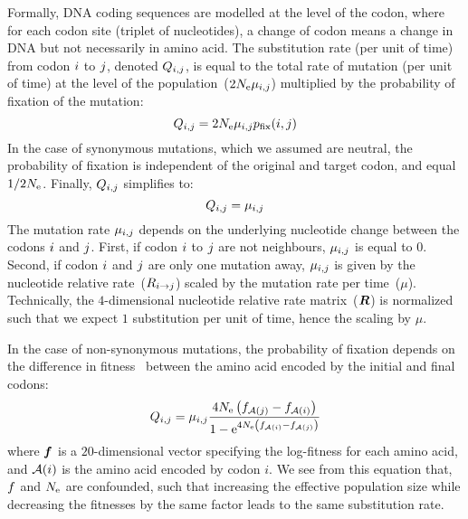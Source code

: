 Formally, \acrshort{DNA} coding sequences are modelled at the level of the codon, where for each codon site (triplet of nucleotides), a change of codon means a change in \acrshort{DNA} but not necessarily in amino acid.
The substitution rate (per unit of time) from codon ${i}$ to ${j}$, denoted $Q_{{i}, {j}}$, is equal to the total rate of mutation (per unit of time) at the level of the population~($2N_{\mathrm{e}}\mu_{{i}, {j}}$) multiplied by the probability of fixation of the mutation:
\begin{equation}
{Q_{{i}, {j}}}
    = 2 N_{\mathrm{e}} \mu_{{i}, {j}} p_{\mathrm{fix}}({i}, {j})
\end{equation}
In the case of synonymous mutations, which we assumed are neutral, the probability of fixation is independent of the original and target codon, and equal $1/2 N_{\mathrm{e}}$.
Finally, ${Q_{{i}, {j}}}$ simplifies to:
\begin{equation}
    Q_{{i}, {j}} = \mu_{{i}, {j}}
\end{equation}
The mutation rate $\mu_{{i}, {j}}$ depends on the underlying nucleotide change between the codons ${i}$ and ${j}$.
First, if codon ${i}$ to ${j}$ are not neighbours, $\mu_{{i}, {j}}$ is equal to $0$.
Second, if codon ${i}$ and ${j}$ are only one mutation away, $\mu_{{i}, {j}}$ is given by the nucleotide relative rate~(${R_{{i} \rightarrow {j}}}$) scaled by the mutation rate per time~($\mu$).
Technically, the $4$-dimensional nucleotide relative rate matrix~($\bm{R}$) is normalized such that we expect $1$ substitution per unit of time, hence the scaling by $\mu$.

In the case of non-synonymous mutations, the probability of fixation depends on the difference in fitness~\citep{Ohta1992} between the amino acid encoded by the initial and final codons:
\begin{equation}
    \label{eq:mutationSelection}
    {\submatrix_{\itoj}} = \mu_{\itoj} \dfrac{4 \Ne \left({\fitj - \fiti}\right)}{{1 - \e^{4 \Ne \left({\fiti - \fitj}\right)} }}
\end{equation}
where $\bm{f}$ is a $20$-dimensional vector specifying the log-fitness for each amino acid, and $\mathcal{A}({i})$ is the amino acid encoded by codon $i$.
We see from this equation that, $f$ and $N_{\mathrm{e}}$ are confounded, such that increasing the effective population size while decreasing the fitnesses by the same factor leads to the same substitution rate.

